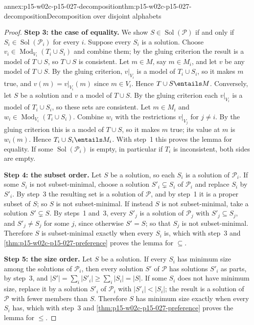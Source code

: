 \begin{annexitem}{annex:p15-w02c-p15-027-decomposition}{thm:p15-w02c-p15-027-decomposition}{Decomposition over disjoint alphabets}
\begin{proof}
\textbf{Step 3: the case of equality.}\enspace
We show \(S\in\operatorname{Sol}(\mathcal P)\) if and only if
\(S_i\in\operatorname{Sol}(\mathcal P_i)\) for every \(i\).
Suppose every \(S_i\) is a solution. Choose
\(v_i\in\operatorname{Mod}_{V_i}(T_i\cup S_i)\) and combine them; by the
gluing criterion the result is a model of \(T\cup S\), so \(T\cup S\) is
consistent. Let \(m\in M\), say \(m\in M_i\), and let \(v\) be any model of
\(T\cup S\). By the gluing criterion, \(v|_{V_i}\) is a model of
\(T_i\cup S_i\), so it makes \(m\) true, and \(v(m)=v|_{V_i}(m)\) since
\(m\in V_i\). Hence \(T\cup S\entails M\).
Conversely, let \(S\) be a solution and \(v\) a model of \(T\cup S\). By the
gluing criterion each \(v|_{V_i}\) is a model of \(T_i\cup S_i\), so these
sets are consistent. Let \(m\in M_i\) and
\(w_i\in\operatorname{Mod}_{V_i}(T_i\cup S_i)\). Combine \(w_i\) with the
restrictions \(v|_{V_j}\) for \(j\ne i\). By the gluing criterion this is a
model of \(T\cup S\), so it makes \(m\) true; its value at \(m\) is
\(w_i(m)\). Hence \(T_i\cup S_i\entails M_i\).
With step~1 this proves the lemma for equality. If some
\(\operatorname{Sol}(\mathcal P_i)\) is empty, in particular if \(T_i\) is
inconsistent, both sides are empty.

\textbf{Step 4: the subset order.}\enspace
Let \(S\) be a solution, so each \(S_i\) is a solution of
\(\mathcal P_i\). If some \(S_i\) is not subset-minimal, choose a solution
\(S'_i\subsetneq S_i\) of \(\mathcal P_i\) and replace \(S_i\) by
\(S'_i\). By step~3 the resulting set is a solution of \(\mathcal P\), and
by step~1 it is a proper subset of \(S\); so \(S\) is not subset-minimal.
If instead \(S\) is not subset-minimal, take a solution \(S'\subsetneq S\).
By steps~1 and~3, every \(S'_j\) is a solution of \(\mathcal P_j\) with
\(S'_j\subseteq S_j\), and \(S'_j\ne S_j\) for some \(j\), since otherwise
\(S'=S\); so that \(S_j\) is not subset-minimal. Therefore \(S\) is
subset-minimal exactly when every \(S_i\) is, which with step~3 and
\cref{thm:p15-w02c-p15-027-preference} proves the lemma for \(\subseteq\).

\textbf{Step 5: the size order.}\enspace
Let \(S\) be a solution. If every \(S_i\) has minimum size among the
solutions of \(\mathcal P_i\), then every solution \(S'\) of \(\mathcal P\)
has solutions \(S'_i\) as parts, by step~3, and
\(|S'|=\sum_i|S'_i|\ge\sum_i|S_i|=|S|\). If some \(S_i\) does not have
minimum size, replace it by a solution \(S'_i\) of \(\mathcal P_i\) with
\(|S'_i|<|S_i|\); the result is a solution of \(\mathcal P\) with fewer
members than \(S\). Therefore \(S\) has minimum size exactly when every
\(S_i\) has, which with step~3 and
\cref{thm:p15-w02c-p15-027-preference} proves the lemma for \(\le\).


\end{proof}
\end{annexitem}
